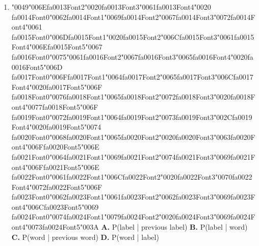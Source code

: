 \documentclass[11pt]{article}
\begin{document}
\begin{enumerate}[leftmargin=*]
  \item {\char"0049}{\char"006E}{\csname fa0013Font2\endcsname\char"0020}{\csname fa0013Font3\endcsname\char"0061}{\csname fa0013Font4\endcsname\char"0020} {\csname fa0014Font0\endcsname\char"0062}{\csname fa0014Font1\endcsname\char"0069}{\csname fa0014Font2\endcsname\char"0067}{\csname fa0014Font3\endcsname\char"0072}{\csname fa0014Font4\endcsname\char"0061} {\csname fa0015Font0\endcsname\char"006D}{\csname fa0015Font1\endcsname\char"0020}{\csname fa0015Font2\endcsname\char"006C}{\csname fa0015Font3\endcsname\char"0061}{\csname fa0015Font4\endcsname\char"006E}{\csname fa0015Font5\endcsname\char"0067} {\csname fa0016Font0\endcsname\char"0075}{\char"0061}{\csname fa0016Font2\endcsname\char"0067}{\csname fa0016Font3\endcsname\char"0065}{\csname fa0016Font4\endcsname\char"0020}{\csname fa0016Font5\endcsname\char"006D} {\csname fa0017Font0\endcsname\char"006F}{\csname fa0017Font1\endcsname\char"0064}{\csname fa0017Font2\endcsname\char"0065}{\csname fa0017Font3\endcsname\char"006C}{\csname fa0017Font4\endcsname\char"0020}{\csname fa0017Font5\endcsname\char"006F} {\csname fa0018Font0\endcsname\char"0076}{\csname fa0018Font1\endcsname\char"0065}{\csname fa0018Font2\endcsname\char"0072}{\csname fa0018Font3\endcsname\char"0020}{\csname fa0018Font4\endcsname\char"0077}{\csname fa0018Font5\endcsname\char"006F} {\csname fa0019Font0\endcsname\char"0072}{\csname fa0019Font1\endcsname\char"0064}{\csname fa0019Font2\endcsname\char"0073}{\csname fa0019Font3\endcsname\char"002C}{\csname fa0019Font4\endcsname\char"0020}{\csname fa0019Font5\endcsname\char"0074} {\csname fa0020Font0\endcsname\char"0068}{\csname fa0020Font1\endcsname\char"0065}{\csname fa0020Font2\endcsname\char"0020}{\csname fa0020Font3\endcsname\char"0063}{\csname fa0020Font4\endcsname\char"006F}{\csname fa0020Font5\endcsname\char"006E} {\csname fa0021Font0\endcsname\char"0064}{\csname fa0021Font1\endcsname\char"0069}{\csname fa0021Font2\endcsname\char"0074}{\csname fa0021Font3\endcsname\char"0069}{\csname fa0021Font4\endcsname\char"006F}{\csname fa0021Font5\endcsname\char"006E} {\csname fa0022Font0\endcsname\char"0061}{\csname fa0022Font1\endcsname\char"006C}{\csname fa0022Font2\endcsname\char"0020}{\csname fa0022Font3\endcsname\char"0070}{\csname fa0022Font4\endcsname\char"0072}{\csname fa0022Font5\endcsname\char"006F} {\csname fa0023Font0\endcsname\char"0062}{\csname fa0023Font1\endcsname\char"0061}{\csname fa0023Font2\endcsname\char"0062}{\csname fa0023Font3\endcsname\char"0069}{\csname fa0023Font4\endcsname\char"006C}{\csname fa0023Font5\endcsname\char"0069} {\csname fa0024Font0\endcsname\char"0074}{\csname fa0024Font1\endcsname\char"0079}{\csname fa0024Font2\endcsname\char"0020}{\csname fa0024Font3\endcsname\char"0069}{\csname fa0024Font4\endcsname\char"0073}{\csname fa0024Font5\endcsname\char"003A}
    \textbf{A.} P(label | previous label)
    \textbf{B.} P(label | word)
    \textbf{C.} P(word | previous word)
    \textbf{D.} P(word | label)


\end{enumerate}
\end{document}
